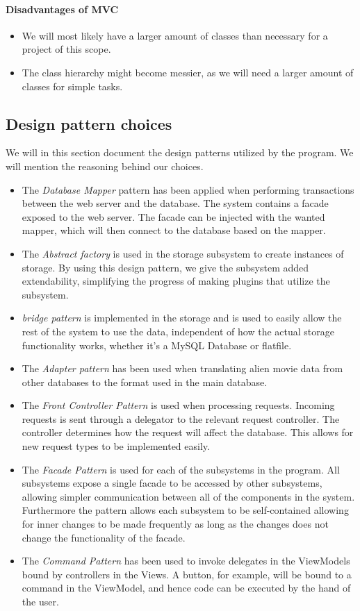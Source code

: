 \paragraph{Disadvantages of MVC}
\begin{itemize}
	\item We will most likely have a larger amount of classes than necessary for a project of this scope. \\
	\item The class hierarchy might become messier, as we will need a larger amount of classes for simple tasks.
\end{itemize}

\subsection{Design pattern choices}
We will in this section document the design patterns utilized by the program. We will mention the reasoning behind our choices.

\begin{itemize}
	\item The \emph{Database Mapper} pattern has been applied when performing transactions between the web server and the database. The system contains a facade exposed to the web server. The facade can be injected with the wanted mapper, which will then connect to the database based on the mapper.
	\item The \emph{Abstract factory} is used in the storage subsystem to create instances of storage. By using this design pattern, we give the subsystem added extendability, simplifying the progress of making plugins that utilize the subsystem.
	\item \emph{bridge pattern} is implemented in the storage and is used to easily allow the rest of the system to use the data, independent of how the actual storage functionality works, whether it's a MySQL Database or flatfile.
	\item The \emph{Adapter pattern} has been used when translating alien movie data from other databases to the format used in the main database.
	\item The \emph{Front Controller Pattern} is used when processing requests. Incoming requests is sent through a delegator to the relevant request controller. The controller determines how the request will affect the database. This allows for new request types to be implemented easily.
	\item The \emph{Facade Pattern} is used for each of the subsystems in the program. All subsystems expose a single facade to be accessed by other subsystems, allowing simpler communication between all of the components in the system. Furthermore the pattern allows each subsystem to be self-contained allowing for inner changes to be made frequently as long as the changes does not change the functionality of the facade.
	\item The \emph{Command Pattern} has been used to invoke delegates in the ViewModels bound by controllers in the Views. A button, for example, will be bound to a command in the ViewModel, and hence code can be executed by the hand of the user.
\end{itemize}

